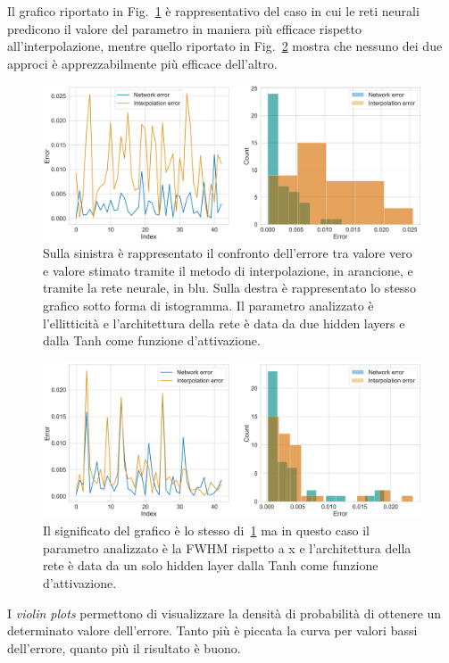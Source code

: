 \documentclass[12pt,a4paper,final]{book}
\begin{document}
Il grafico riportato in Fig.~\ref{hist_good} è rappresentativo del caso in cui le reti neurali predicono il valore del parametro in maniera più efficace rispetto all'interpolazione, mentre quello riportato in Fig.~\ref{hist_bad} mostra che nessuno dei due approci è apprezzabilmente più efficace dell'altro.

\begin{figure}[!ht]
	\centering
	\includegraphics[width=\linewidth]{../figures/hist_good.png}
	\caption{Sulla sinistra è rappresentato il confronto dell'errore tra valore vero e valore stimato tramite il metodo di interpolazione, in arancione, e tramite la rete neurale, in blu. Sulla destra è rappresentato lo stesso grafico sotto forma di istogramma. Il parametro analizzato è l'ellitticità e l'architettura della rete è data da due hidden layers e dalla Tanh come funzione d'attivazione.}
	\label{hist_good}
\end{figure}

\begin{figure}[!ht]
	\centering
	\includegraphics[width=\linewidth]{../figures/hist_bad.png}
	\caption{Il significato del grafico è lo stesso di~\ref{hist_good} ma in questo caso il parametro analizzato è la FWHM rispetto a x e l'architettura della rete è data da un solo hidden layer dalla Tanh come funzione d'attivazione.}
	\label{hist_bad}
\end{figure}


I \textit{violin plots} permettono di visualizzare la densità di probabilità di ottenere un determinato valore dell'errore. Tanto più è piccata la curva per valori bassi dell'errore, quanto più il risultato è buono.
\end{document}
